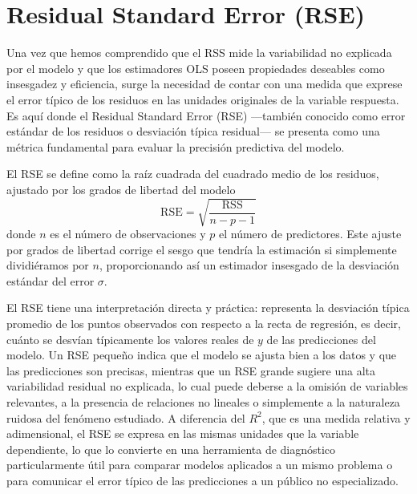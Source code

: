 \documentclass[12pt, a4paper]{article}
\begin{document}

\section{Residual Standard Error (RSE)}

Una vez que hemos comprendido que el RSS mide la variabilidad no explicada por el modelo y que los estimadores OLS poseen propiedades deseables como insesgadez y eficiencia, surge la necesidad de contar con una medida que exprese el error típico de los residuos en las unidades originales de la variable respuesta. Es aquí donde el Residual Standard Error (RSE) —también conocido como error estándar de los residuos o desviación típica residual— se presenta como una métrica fundamental para evaluar la precisión predictiva del modelo.

 El RSE se define como la raíz cuadrada del cuadrado medio de los residuos, ajustado por los grados de libertad del modelo
 $$\mathrm{RSE}=\sqrt{\frac{\mathrm{RSS}}{n-p-1}}$$
 donde $n$ es el número de observaciones y $p$ el número de predictores. Este ajuste por grados de libertad corrige el sesgo que tendría la estimación si simplemente dividiéramos por $n$, proporcionando así un estimador insesgado de la desviación estándar del error $\sigma$. 
 
 El RSE tiene una interpretación directa y práctica: representa la desviación típica promedio de los puntos observados con respecto a la recta de regresión, es decir, cuánto se desvían típicamente los valores reales de $y$ de las predicciones del modelo. Un RSE pequeño indica que el modelo se ajusta bien a los datos y que las predicciones son precisas, mientras que un RSE grande sugiere una alta variabilidad residual no explicada, lo cual puede deberse a la omisión de variables relevantes, a la presencia de relaciones no lineales o simplemente a la naturaleza ruidosa del fenómeno estudiado. A diferencia del $R^2$, que es una medida relativa y adimensional, el RSE se expresa en las mismas unidades que la variable dependiente, lo que lo convierte en una herramienta de diagnóstico particularmente útil para comparar modelos aplicados a un mismo problema o para comunicar el error típico de las predicciones a un público no especializado.
\end{document}
